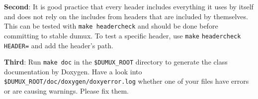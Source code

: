 \textbf{Second}: It is good practice that every header includes everything it uses by itself and does not rely on the includes from headers that are included by themselves. This can be tested with \texttt{make headercheck} and should be done before committing to stable dumux. To test a specific header, use \texttt{make} \texttt{headercheck} \texttt{HEADER=} and add the header's path.

\textbf{Third}: Run \texttt{make doc} in the \texttt{\$DUMUX\_ROOT} directory to generate the class documentation by Doxygen. Have a look into \texttt{\$DUMUX\_ROOT/doc/doxygen/doxyerror.log} whether one of your files have errors or are causing warnings. Please fix them.
